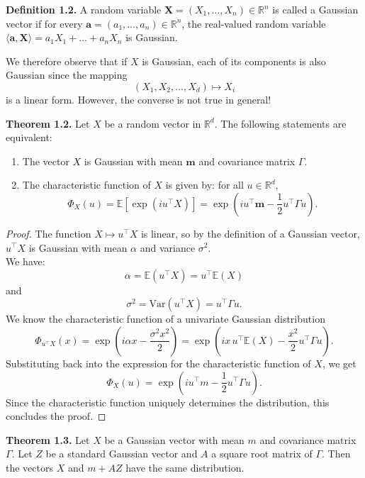 \documentclass[12pt]{article}
\begin{document}
\newpage

\textbf{Definition 1.2.}
A random variable $\mathbf{X} = (X_1, \dots, X_n) \in \mathbb{R}^n$ is called a Gaussian vector if for every $\mathbf{a} = (a_1, \dots, a_n) \in \mathbb{R}^n$, the real-valued random variable $\langle \mathbf{a}, \mathbf{X} \rangle = a_1 X_1 + \dots + a_n X_n$ is Gaussian.

\vspace{0.3cm}

We therefore observe that if $X$ is Gaussian, each of its components is also Gaussian since the mapping
\[
(X_1, X_2, \ldots, X_d) \mapsto X_i
\]
is a linear form.
However, the converse is not true in general!

\vspace{0.3cm}

\textbf{Theorem 1.2.} Let $X$ be a random vector in $\mathbb{R}^d$. The following statements are equivalent:
\begin{enumerate}
    \item The vector $X$ is Gaussian with mean $\mathbf{m}$ and covariance matrix $\Gamma$.
    \item The characteristic function of $X$ is given by: for all $u \in \mathbb{R}^d$,
    \[
    \Phi_X(u) = \mathbb{E}\!\left[ \exp(i u^\top X) \right] = \exp\!\left( i u^\top \mathbf{m} - \frac{1}{2} u^\top \Gamma u \right).
    \]
\end{enumerate}

\begin{proof}
The function $X \mapsto u^\top X$ is linear, so by the definition of a Gaussian vector, $u^\top X$ is Gaussian with mean $\alpha$ and variance $\sigma^2$.\\
We have:
\[
\alpha = \mathbb{E}(u^\top X) = u^\top \mathbb{E}(X)
\]
and
\[
\sigma^2 = \mathrm{Var}(u^\top X) = u^\top \Gamma u.
\]
We know the characteristic function of a univariate Gaussian distribution
\[
\varPhi_{u^\top X}(x) = \exp\!\left(i \alpha x - \frac{\sigma^2 x^2}{2}\right)
= \exp\!\left(i x\, u^\top \mathbb{E}(X) - \frac{x^2}{2} u^\top \Gamma u\right).
\]
Substituting back into the expression for the characteristic function of $X$, we get
\[
\varPhi_X(u) = \exp\!\left(i u^\top m - \frac{1}{2} u^\top \Gamma u\right).
\]
Since the characteristic function uniquely determines the distribution, this concludes the proof.
\end{proof}

\vspace{0.3cm}

\textbf{Theorem 1.3. }
Let $X$ be a Gaussian vector with mean $m$ and covariance matrix $\Gamma$. Let $Z$ be a standard Gaussian vector and $A$ a square root matrix of $\Gamma$. Then the vectors $X$ and $m + AZ$ have the same distribution.
\end{document}
